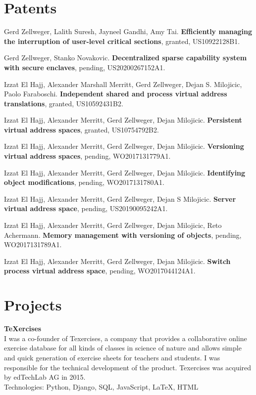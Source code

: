 \documentclass[margin,line]{cv/cv}
\begin{document}
\begin{resume}
    \section{\mysidestyle Patents}

    Gerd Zellweger, Lalith Suresh, Jayneel Gandhi, Amy Tai.
    \textbf{Efficiently managing the interruption of user-level critical sections},
    granted, US10922128B1.

    Gerd Zellweger, Stanko Novakovic.
    \textbf{Decentralized sparse capability system with secure enclaves},
    pending, US20200267152A1.

    Izzat El Hajj, Alexander Marshall Merritt, Gerd Zellweger, Dejan S. Milojicic, Paolo Faraboschi.
    \textbf{Independent shared and process virtual address translations},
    granted, US10592431B2.

    Izzat El Hajj, Alexander Merritt, Gerd Zellweger, Dejan Milojicic.
    \textbf{Persistent virtual address spaces},
    granted, US10754792B2.

    Izzat El Hajj, Alexander Merritt, Gerd Zellweger, Dejan Milojicic.
    \textbf{Versioning virtual address spaces},
    pending, WO2017131779A1.

    Izzat El Hajj, Alexander Merritt, Gerd Zellweger, Dejan Milojicic.
    \textbf{Identifying object modifications},
    pending, WO2017131780A1.

    Izzat El Hajj, Alexander Merritt, Gerd Zellweger, Dejan S Milojicic.
    \textbf{Server virtual address space},
    pending, US20190095242A1.

    Izzat El Hajj, Alexander Merritt, Gerd Zellweger, Dejan Milojicic, Reto Achermann.
    \textbf{Memory management with versioning of objects},
    pending, WO2017131789A1.

    Izzat El Hajj, Alexander Merritt, Gerd Zellweger, Dejan Milojicic.
    \textbf{Switch process virtual address space},
    pending, WO2017044124A1.


    \section{\mysidestyle Projects}
    \textbf{{\TeX}ercises} \\\vspace{1mm}%
    I was a co-founder of Texercises, a company that provides a collaborative online
    exercise database for all kinds of classes in science of nature and allows
    simple and quick generation of exercise sheets for teachers and students. I was
    responsible for the technical development of the product. Texercises was
    acquired by edTechLab AG in 2015.\\
    Technologies: Python, Django, SQL, JavaScript, LaTeX, HTML


\end{resume}
\end{document}
